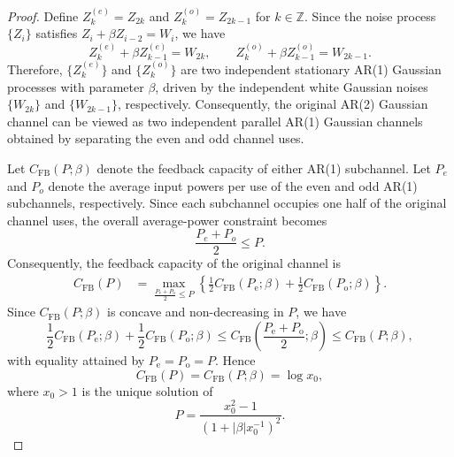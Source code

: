 \documentclass[10pt,a4paper]{amsart}
\begin{document}
\begin{proof}
Define $Z_k^{(e)}=Z_{2k}$ and $Z^{(o)}_k=Z_{2k-1}$ for $k\in\mathbb{Z}$. Since the noise process $\{Z_i\}$ satisfies $Z_i+\beta Z_{i-2}=W_i$, we have
$$
Z^{(e)}_{k}+\beta Z_{k-1}^{(e)}=W_{2k}, \qquad Z^{(o)}_{k}+\beta Z^{(o)}_{k-1}=W_{2k-1}.
$$
Therefore, $\{Z^{(e)}_k\}$ and $\{Z^{(o)}_k\}$ are two independent stationary AR(1) Gaussian processes with parameter $\beta$, driven by the independent white Gaussian noises $\{W_{2k}\}$ and $\{W_{2k-1}\}$, respectively. Consequently, the original AR(2) Gaussian channel can be viewed as two independent parallel AR(1) Gaussian channels obtained by separating the even and odd channel uses.

Let $C_{\mathrm{FB}}(P;\beta)$ denote the feedback capacity of either AR(1) subchannel. Let $P_e$ and $P_o$ denote the average input powers per use of the even and odd AR(1) subchannels, respectively. Since each subchannel occupies one half of the original channel uses, the overall average-power constraint becomes
$$
\frac{P_e+P_o}{2}\le P.
$$
Consequently, the feedback capacity of the original channel is
\begin{equation*}\label{CFB-interleave-ar2}
\begin{aligned}
C_{\mathrm{FB}}(P)
&= \max_{\frac{P_{\mathrm e}+P_{\mathrm o}}{2}\le P}
\left\{
\frac12 C_{\mathrm{FB}}(P_{\mathrm e};\beta) + \frac12 C_{\mathrm{FB}}(P_{\mathrm o};\beta) \right\}.
\end{aligned}
\end{equation*}
Since $C_\mathrm{FB}(P;\beta)$ is concave and non-decreasing in $P$, we have
$$
\frac12 C_\mathrm{FB}(P_{\mathrm e};\beta) + \frac12 C_{\mathrm{FB}}(P_{\mathrm o};\beta)
\le
C_{\mathrm{FB}}\left(\frac{P_{\mathrm e}+P_{\mathrm o}}{2};\beta\right)
\le
C_{\mathrm{FB}}(P;\beta),
$$
with equality attained by $P_{\mathrm e}=P_{\mathrm o}=P$. Hence
\begin{equation}\label{CFB-interleave-ar2-2}
C_{\mathrm{FB}}(P)= C_{\mathrm{FB}}(P;\beta)=\log x_0,
\end{equation}
where $x_0>1$ is the unique solution of
\begin{equation}\label{eq:interleaved-capacity}
P= \frac{x_0^2-1} {\left(1+|\beta|x_0^{-1}\right)^2}.
\end{equation}


\end{proof}
\end{document}

